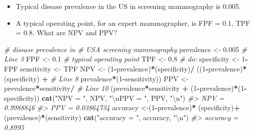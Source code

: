 \documentclass[
]{book}
\newenvironment{Shaded}{\begin{snugshade}}{\end{snugshade}}
\newcommand{\CharTok}[1]{\textcolor[rgb]{0.31,0.60,0.02}{#1}}
\newcommand{\CommentTok}[1]{\textcolor[rgb]{0.56,0.35,0.01}{\textit{#1}}}
\newcommand{\DecValTok}[1]{\textcolor[rgb]{0.00,0.00,0.81}{#1}}
\newcommand{\FloatTok}[1]{\textcolor[rgb]{0.00,0.00,0.81}{#1}}
\newcommand{\KeywordTok}[1]{\textcolor[rgb]{0.13,0.29,0.53}{\textbf{#1}}}
\newcommand{\NormalTok}[1]{#1}
\newcommand{\OperatorTok}[1]{\textcolor[rgb]{0.81,0.36,0.00}{\textbf{#1}}}
\newcommand{\StringTok}[1]{\textcolor[rgb]{0.31,0.60,0.02}{#1}}
\providecommand{\tightlist}{%
  \setlength{\itemsep}{0pt}\setlength{\parskip}{0pt}}
\begin{document}
\begin{itemize}
\tightlist
\item
  Typical disease prevalence in the US in screening mammography is 0.005.
\item
  A typical operating point, for an expert mammographer, is FPF = 0.1, TPF = 0.8. What are NPV and PPV?
\end{itemize}

\begin{Shaded}
\begin{Highlighting}[]
\CommentTok{\# disease prevalence in }
\CommentTok{\# USA screening mammography}
\NormalTok{prevalence \textless{}{-}}\StringTok{ }\FloatTok{0.005} \CommentTok{\# Line 3}
\NormalTok{FPF \textless{}{-}}\StringTok{ }\FloatTok{0.1} \CommentTok{\# typical operating point}
\NormalTok{TPF \textless{}{-}}\StringTok{ }\FloatTok{0.8} \CommentTok{\#        do:}
\NormalTok{specificity \textless{}{-}}\StringTok{ }\DecValTok{1}\OperatorTok{{-}}\NormalTok{FPF}
\NormalTok{sensitivity \textless{}{-}}\StringTok{ }\NormalTok{TPF}
\NormalTok{NPV \textless{}{-}}\StringTok{ }\NormalTok{(}\DecValTok{1}\OperatorTok{{-}}\NormalTok{prevalence)}\OperatorTok{*}\NormalTok{(specificity)}\OperatorTok{/}
\StringTok{  }\NormalTok{((}\DecValTok{1}\OperatorTok{{-}}\NormalTok{prevalence)}\OperatorTok{*}\NormalTok{(specificity) }\OperatorTok{+}\StringTok{  }\CommentTok{\# Line 8}
\StringTok{     }\NormalTok{prevalence}\OperatorTok{*}\NormalTok{(}\DecValTok{1}\OperatorTok{{-}}\NormalTok{sensitivity))}
\NormalTok{PPV \textless{}{-}}\StringTok{ }\NormalTok{prevalence}\OperatorTok{*}\NormalTok{sensitivity}\OperatorTok{/}\StringTok{ }\CommentTok{\# Line 10}
\StringTok{  }\NormalTok{(prevalence}\OperatorTok{*}\NormalTok{sensitivity }\OperatorTok{+}\StringTok{ }
\StringTok{     }\NormalTok{(}\DecValTok{1}\OperatorTok{{-}}\NormalTok{prevalence)}\OperatorTok{*}\NormalTok{(}\DecValTok{1}\OperatorTok{{-}}\NormalTok{specificity))}
\KeywordTok{cat}\NormalTok{(}\StringTok{"NPV = "}\NormalTok{, NPV, }\StringTok{"}\CharTok{\textbackslash{}n}\StringTok{PPV = "}\NormalTok{, PPV, }\StringTok{"}\CharTok{\textbackslash{}n}\StringTok{"}\NormalTok{)}
\CommentTok{\#\textgreater{} NPV =  0.9988846 }
\CommentTok{\#\textgreater{} PPV =  0.03864734}
\NormalTok{accuracy \textless{}{-}(}\DecValTok{1}\OperatorTok{{-}}\NormalTok{prevalence)}\OperatorTok{*}
\StringTok{  }\NormalTok{(specificity)}\OperatorTok{+}\NormalTok{(prevalence)}\OperatorTok{*}\NormalTok{(sensitivity)}
\KeywordTok{cat}\NormalTok{(}\StringTok{"accuracy = "}\NormalTok{, accuracy, }\StringTok{"}\CharTok{\textbackslash{}n}\StringTok{"}\NormalTok{)}
\CommentTok{\#\textgreater{} accuracy =  0.8995}
\end{Highlighting}
\end{Shaded}
\end{document}
